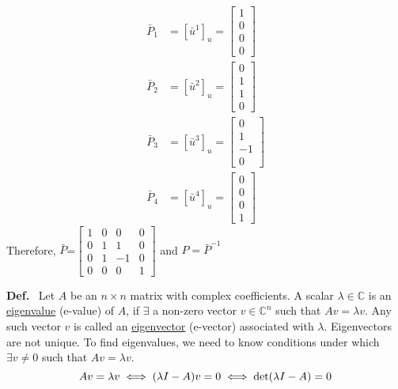 \documentclass[letterpaper]{article}
\begin{document}
    \begin{align*}
        \bar{P}_{1}&=[\bar{u}^{1}]_{u}=\left[\begin{array}{c}
            1\\
            0\\
            0\\
            0
        \end{array}\right]\\
        \bar{P}_{2}&=[\bar{u}^{2}]_{u}=\left[\begin{array}{c}
            0\\
            1\\
            1\\
            0
        \end{array}\right]\\
        \bar{P}_{3}&=[\bar{u}^{3}]_{u}=\left[\begin{array}{c}
            0\\
            1\\
            -1\\
            0
        \end{array}\right]\\
        \bar{P}_{4}&=[\bar{u}^{4}]_{u}=\left[\begin{array}{c}
            0\\
            0\\
            0\\
            1
        \end{array}\right]
    \end{align*}
    Therefore, $\bar{P}$=$\left[\begin{array}{cccc}
        1 & 0 & 0 & 0\\
        0 & 1 & 1 & 0\\
        0 & 1 & -1 & 0\\
        0 & 0 & 0 & 1
    \end{array}\right]$ and $P=\bar{P}^{-1}$

\vspace*{3cm}

\noindent \textbf{Def.}~ Let $A$ be an $n\times n$ matrix with complex coefficients. A scalar $\lambda \in \mathbb{C} $ is an \underline{eigenvalue} (e-value) of $A$, if $\exists$ a non-zero vector $v \in \mathbb{C}^{n}$ such that $Av=\lambda v$. Any such vector $v$ is called an \underline{eigenvector} (e-vector) associated with $\lambda$. Eigenvectors are not unique.
    \newline\newline
    To find eigenvalues, we need to know conditions under which $\exists v\neq0$ such that $Av=\lambda v$.
    \begin{equation*}
        Av=\lambda v \iff(\lambda I-A)v=0\iff \textnormal{det}(\lambda I-A)=0
    \end{equation*}
\end{document}
